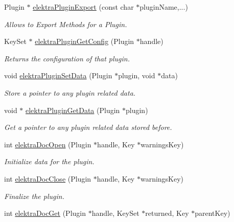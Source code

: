 \begin{DoxyCompactItemize}
\item 
Plugin $\ast$ \hyperlink{group__plugin_ga8dd092048e972a3f0c9c9f54eb41576e}{elektra\-Plugin\-Export} (const char $\ast$plugin\-Name,...)
\begin{DoxyCompactList}\small\item\em Allows to Export Methods for a Plugin. \end{DoxyCompactList}\item 
Key\-Set $\ast$ \hyperlink{group__plugin_ga644bead796506c172817724051c977c9}{elektra\-Plugin\-Get\-Config} (Plugin $\ast$handle)
\begin{DoxyCompactList}\small\item\em Returns the configuration of that plugin. \end{DoxyCompactList}\item 
void \hyperlink{group__plugin_gaf4b941a52ff55d0ca2a9158d90208ef2}{elektra\-Plugin\-Set\-Data} (Plugin $\ast$plugin, void $\ast$data)
\begin{DoxyCompactList}\small\item\em Store a pointer to any plugin related data. \end{DoxyCompactList}\item 
void $\ast$ \hyperlink{group__plugin_gaafcf3216b46292f222b8cc7828b4dd20}{elektra\-Plugin\-Get\-Data} (Plugin $\ast$plugin)
\begin{DoxyCompactList}\small\item\em Get a pointer to any plugin related data stored before. \end{DoxyCompactList}\item 
int \hyperlink{group__plugin_ga23c2eb3584e38a4d494eb8f91e5e3d8d}{elektra\-Doc\-Open} (Plugin $\ast$handle, Key $\ast$warnings\-Key)
\begin{DoxyCompactList}\small\item\em Initialize data for the plugin. \end{DoxyCompactList}\item 
int \hyperlink{group__plugin_ga1236aefe5b2baf8b7bf636ba5aa9ea29}{elektra\-Doc\-Close} (Plugin $\ast$handle, Key $\ast$warnings\-Key)
\begin{DoxyCompactList}\small\item\em Finalize the plugin. \end{DoxyCompactList}\item 
int \hyperlink{group__plugin_gacb69f3441c6d84241b4362f958fbe313}{elektra\-Doc\-Get} (Plugin $\ast$handle, Key\-Set $\ast$returned, Key $\ast$parent\-Key)

\end{DoxyCompactItemize}
